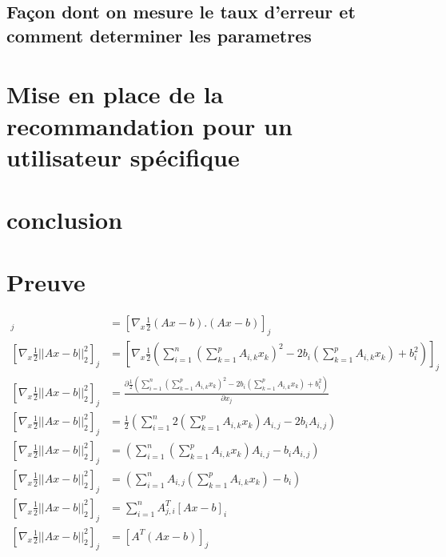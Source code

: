 \documentclass[a4paper,10pt]{article}
\begin{document}
\subsection{Façon dont on mesure le taux d'erreur et comment determiner les parametres}
\section{Mise en place de la recommandation pour un utilisateur spécifique}
\section{conclusion}
\appendix
\section{Preuve}
\begin{align*}
[\nabla_{x} \frac{1}{2}||Ax - b||^{2}_{2}]_{j} &= [\nabla_{x} \frac{1}{2}(Ax - b).(Ax - b)]_{j}\\
[\nabla_{x} \frac{1}{2}||Ax - b||^{2}_{2}]_{j} &= [\nabla_{x} \frac{1}{2}(\sum^{n}_{i = 1} (\sum^{p}_{k = 1} A_{i, k}x_{k})^{2} - 2b_{i}(\sum^{p}_{k = 1} A_{i, k}x_{k}) + b_{i}^{2})]_{j}\\
[\nabla_{x} \frac{1}{2}||Ax - b||^{2}_{2}]_{j} &= \frac{\partial\frac{1}{2}(\sum^{n}_{i = 1} (\sum^{p}_{k = 1} A_{i, k}x_{k})^{2} - 2b_{i}(\sum^{p}_{k = 1} A_{i, k}x_{k}) + b_{i}^{2})}{\partial x_{j}}\\
[\nabla_{x} \frac{1}{2}||Ax - b||^{2}_{2}]_{j} &= \frac{1}{2}(\sum^{n}_{i = 1} 2(\sum^{p}_{k = 1} A_{i, k}x_{k})A_{i, j} - 2b_{i} A_{i, j})\\
[\nabla_{x} \frac{1}{2}||Ax - b||^{2}_{2}]_{j} &= (\sum^{n}_{i = 1} (\sum^{p}_{k = 1} A_{i, k}x_{k})A_{i, j} - b_{i} A_{i, j})\\
[\nabla_{x} \frac{1}{2}||Ax - b||^{2}_{2}]_{j} &= (\sum^{n}_{i = 1} A_{i, j}(\sum^{p}_{k = 1} A_{i, k}x_{k}) - b_{i} )\\
[\nabla_{x} \frac{1}{2}||Ax - b||^{2}_{2}]_{j} &= \sum^{n}_{i = 1} A^{T}_{j, i}[Ax - b]_{i}\\
[\nabla_{x} \frac{1}{2}||Ax - b||^{2}_{2}]_{j} &= [A^{T}(Ax - b)]_{j}
\end{align*}
\end{document}
